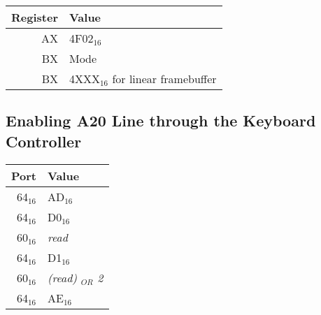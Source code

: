 \documentclass{article}
\begin{document}
\begin{tabular}{|r|l|}
	\hline
	\textbf{Register} & \textbf{Value} \\
	\hline
	AX & 4F02$_{16}$ \\
	\hline
	BX & Mode \\
	\hline
	BX & 4XXX$_{16}$ for linear framebuffer \\
	\hline
\end{tabular}

\subsection{Enabling A20 Line through the Keyboard Controller}
\label{a20}

\begin{tabular}{|r|l|}
	\hline
	\textbf{Port} & \textbf{Value} \\
	\hline
	64$_{16}$ & AD$_{16}$ \\
	\hline
	64$_{16}$ & D0$_{16}$ \\
	\hline
	60$_{16}$ & \emph{read} \\
	\hline
	64$_{16}$ & D1$_{16}$ \\
	\hline
	60$_{16}$ & \emph{(read) $_{OR}$ 2} \\
	\hline
	64$_{16}$ & AE$_{16}$ \\
	\hline
\end{tabular}

\newpage
\end{document}
